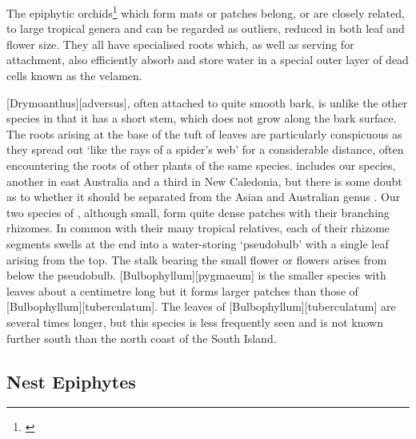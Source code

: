 The epiphytic orchids\footnote{\cite{hatch1948epiphytic}} which form mats or patches belong, or are closely related, to large tropical genera and can be regarded as outliers, reduced in both leaf and flower size.
They all have specialised roots which, as well as serving for attachment, also efficiently absorb and store water in a special outer layer of dead cells known as the velamen.

[Drymoanthus][adversus], often attached to quite smooth bark, is unlike the other species in that it has a short stem, which does not grow along the bark surface.
The roots arising at the base of the tuft of leaves are particularly conspicuous as they spread out `like the rays of a spider's web' for a considerable distance, often encountering the roots of other plants of the same species.  includes our species, another in east Australia and a third in New Caledonia, but there is some doubt as to whether it should be separated from the Asian and Australian genus .
Our two species of , although small, form quite dense patches with their branching rhizomes.
In common with their many tropical relatives, each of their rhizome segments swells at the end into a water-storing `pseudobulb' with a single leaf arising from the top.
The stalk bearing the small flower or flowers arises from below the pseudobulb. [Bulbophyllum][pygmaeum] is the smaller species with leaves about a centimetre long but it forms larger patches than those of [Bulbophyllum][tuberculatum].
The leaves of [Bulbophyllum][tuberculatum] are several times longer, but this species is less frequently seen and is not known further south than the north coast of the South Island.

\subsection{Nest Epiphytes}

